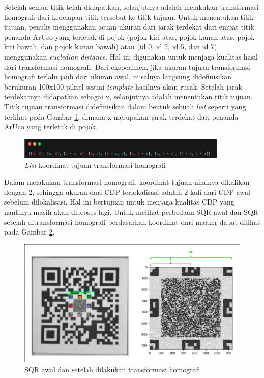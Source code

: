 Setelah semua titik telah didapatkan, selanjutnya adalah melakukan transformasi homografi dari kedelapan titik tersebut ke titik tujuan. Untuk menentukan titik
tujuan, penulis menggunakan acuan ukuran dari jarak terdekat dari empat titik penanda ArUco yang terletak di pojok (pojok kiri atas, pojok kanan atas, pojok
kiri bawah, dan pojok kanan bawah) atau (id 0, id 2, id 5, dan id 7) menggunakan \emph{eucledian distance}. Hal ini digunakan untuk menjaga kualitas hasil dari
transformasi homografi. Dari eksperimen, jika ukuran tujuan transformasi homografi terlalu jauh dari ukuran awal, misalnya langsung didefinisikan berukuran
100x100 piksel sesuai \emph{template} hasilnya akan rusak. Setelah jarak terdekatnya didapatkan sebagai x, selanjutnya adalah menentukan titik tujuan. Titik
tujuan transformasi didefinisikan dalam bentuk sebuah \emph{list} seperti yang terlihat pada Gambar \ref{Fig: 3-koordinattujuan}, dimana x merupakan jarak
terdekat dari penanda ArUco yang terletak di pojok.

\begin{figure}[h]
	\centering
	\includegraphics[width=10cm]{contents/chapter-3/3-koordinattujuan.png}
	\caption{\emph{List} koordinat tujuan transformasi homografi}
	\label{Fig: 3-koordinattujuan}
\end{figure}

Dalam melakukan transformasi homografi, koordinat tujuan nilainya dikalikan dengan 2, sehingga ukuran dari CDP terlokalisasi adalah 2 kali dari CDP awal
sebelum dilokalisasi. Hal ini bertujuan untuk menjaga kualitas CDP yang nantinya masih akan diproses lagi. Untuk melihat perbedaan SQR awal dan SQR setelah
ditransformasi homografi berdasarkan koordinat dari marker dapat dilihat pada Gambar \ref{Fig: 3-hasillokalisasi}.

\begin{figure}[h]
	\centering
	\includegraphics[width=13cm]{contents/chapter-3/3-hasillokalisasi.png}
	\caption{SQR awal dan setelah dilakukan transformasi homografi}
	\label{Fig: 3-hasillokalisasi}
\end{figure}

